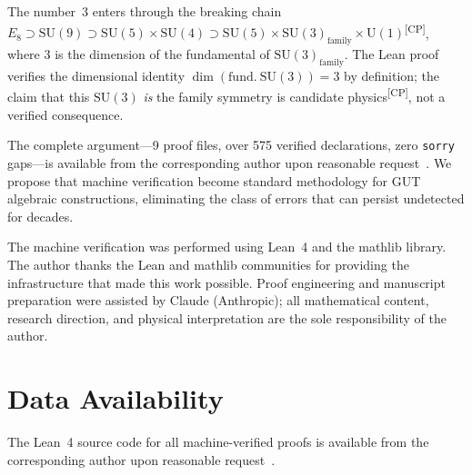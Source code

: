 \documentclass[aps,prl,twocolumn,showpacs,preprintnumbers,superscriptaddress,floatfix]{revtex4-2}
\newcommand{\CP}{\textsuperscript{[CP]}}
\begin{document}
The number~3 enters through the breaking chain
$E_8 \supset \mathrm{SU}(9) \supset \mathrm{SU}(5) \times
\mathrm{SU}(4) \supset \mathrm{SU}(5) \times
\mathrm{SU}(3)_\mathrm{family} \times \mathrm{U}(1)$\CP,
where 3 is the dimension of the fundamental of
$\mathrm{SU}(3)_\mathrm{family}$.
The Lean proof verifies the dimensional identity
$\dim(\mathrm{fund.\ SU}(3)) = 3$ by definition;
the claim that this $\mathrm{SU}(3)$ \emph{is} the family
symmetry is candidate physics\CP, not a verified consequence.

The complete argument---9 proof files, over 575 verified declarations, zero
\texttt{sorry} gaps---is available from the corresponding
author upon reasonable request~\cite{uft-github}.
We propose that machine verification become standard methodology
for GUT algebraic constructions, eliminating the class of errors
that can persist undetected for decades.

\begin{acknowledgments}
The machine verification was performed using Lean~4 and the mathlib
library.  The author thanks the Lean and mathlib communities for
providing the infrastructure that made this work possible.
Proof engineering and manuscript preparation were assisted by Claude
(Anthropic); all mathematical content, research direction, and
physical interpretation are the sole responsibility of the author.
\end{acknowledgments}

\section*{Data Availability}
The Lean~4 source code for all machine-verified proofs is available
from the corresponding author upon reasonable request~\cite{uft-github}.

\end{document}
